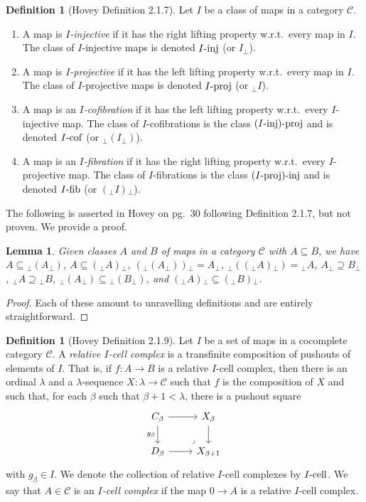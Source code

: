 \documentclass{amsart}
\theoremstyle{plain}
\newtheorem{lemma}[theorem]{Lemma}
\theoremstyle{definition}
\newtheorem{definition}[theorem]{Definition}
\newcommand{\sseq}{\subseteq}
\newcommand{\spseq}{\supseteq}
\newcommand{\0}{\mathbf{0}}
\newcommand{\cC}{\mathcal C}
\newcommand{\p}{{_\perp}}
\renewcommand{\(}{\left(}
\renewcommand{\)}{\right)}
\newcommand{\inj}{\text-\mathrm{inj}}
\newcommand{\proj}{\text-\mathrm{proj}}
\newcommand{\fib}{\text-\mathrm{fib}}
\newcommand{\cell}{\text-\mathrm{cell}}
\newcommand{\cof}{\text-\mathrm{cof}}
\begin{document}
\begin{definition}[Hovey Definition 2.1.7]
  Let $I$ be a class of maps in a category $\cC$.\begin{enumerate}
    \item A map is \textit{$I$-injective} if it has the right lifting property w.r.t.\ every map in $I$. The class of $I$-injective maps is denoted $I\inj$ (or $I\p$).
    \item A map is \textit{$I$-projective} if it has the left lifting property w.r.t.\ every map in $I$. The class of $I$-projective maps is denoted $I\proj$ (or $\p I$).
    \item A map is an \textit{$I$-cofibration} if it has the left lifting property w.r.t.\ every $I$-injective map. The class of $I$-cofibrations is the class $(I\inj)\proj$ and is denoted $I\cof$ (or $\p(I\p)$).
    \item A map is an \textit{$I$-fibration} if it has the right lifting property w.r.t.\ every $I$-projective map. The class of $I$-fibrations is the class $(I\proj)\inj$ and is denoted $I\fib$ (or $(\p I)\p$).
  \end{enumerate}
\end{definition}

The following is asserted in Hovey on pg.\ 30 following Definition 2.1.7, but not proven. We provide a proof.

\begin{lemma}\label{useful_LP_properties}
  Given classes $A$ and $B$ of maps in a category $\cC$ with $A\sseq B$, we have $A\sseq {\p(A\p)}$, $A\sseq (\p A)\p$, $(\p(A\p))\p=A\p$, $\p((\p A)\p)={\p A}$, $A\p\spseq B\p$, $\p A\spseq {\p B}$, ${\p(A\p)}\sseq {\p(B\p)}$, and $(\p A)\p\sseq (\p B)\p$.
\end{lemma}
\begin{proof}
  Each of these amount to unravelling definitions and are entirely straightforward.
\end{proof}

\begin{definition}[Hovey Definition 2.1.9]
  Let $I$ be a set of maps in a cocomplete category $\cC$. A \textit{relative $I$-cell complex} is a transfinite composition of pushouts of elements of $I$. That is, if $f:A\to B$ is a relative $I$-cell complex, then there is an ordinal $\lambda$ and a $\lambda$-sequence $X:\lambda\to\cC$ such that $f$ is the composition of $X$ and such that, for each $\beta$ such that $\beta+1<\lambda$, there is a pushout square
  \[\begin{tikzcd}
    {C_\beta} & {X_\beta} \\
    {D_\beta} & {X_{\beta+1}}
    \arrow[from=1-1, to=1-2]
    \arrow[from=1-2, to=2-2]
    \arrow[from=2-1, to=2-2]
    \arrow["\ulcorner"{anchor=center, pos=0.125, rotate=180}, draw=none, from=2-2, to=1-1]
    \arrow["{g_\beta}"', from=1-1, to=2-1]
  \end{tikzcd}\]
  with $g_\beta\in I$. We denote the collection of relative $I$-cell complexes by $I\cell$. We say that $A\in\cC$ is an \textit{$I$-cell complex} if the map $0\to A$ is a relative $I$-cell complex.
\end{definition}
\end{document}

